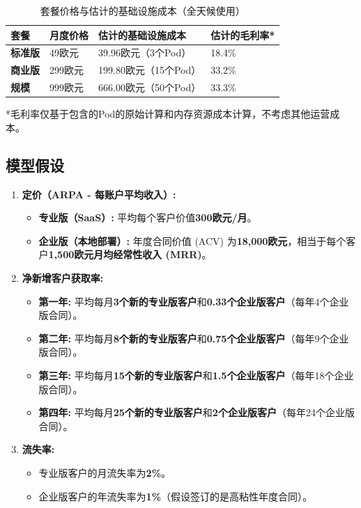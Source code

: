 \documentclass[11点, A4纸, 单面]{article}
\begin{document}
\begin{table}[H]
\centering
\caption{套餐价格与估计的基础设施成本（全天候使用）}
\label{tab:cost_analysis}
\begin{tabularx}{\textwidth}{L X X X} 
\toprule
\textbf{套餐} & \textbf{月度价格} & \textbf{估计的基础设施成本} & \textbf{估计的毛利率*} \\
\midrule
\textbf{标准版} & 49欧元 & 39.96欧元（3个Pod） & 18.4\% \\
\addlinespace
\textbf{商业版} & 299欧元 & 199.80欧元（15个Pod） & 33.2\% \\
\addlinespace
\textbf{规模} & 999欧元 & 666.00欧元（50个Pod） & 33.3\% \\
\bottomrule
\end{tabularx}
\raggedright
\footnotesize{*毛利率仅基于包含的Pod的原始计算和内存资源成本计算，不考虑其他运营成本。}
\end{table}



\subsection{模型假设}
\begin{enumerate}
    \item \textbf{定价（ARPA - 每账户平均收入）:}
    \begin{itemize}
        \item \textbf{专业版（SaaS）:} 平均每个客户价值\textbf{300欧元/月}。
        \item \textbf{企业版（本地部署）:} 年度合同价值 (ACV) 为\textbf{18,000欧元}，相当于每个客户\textbf{1,500欧元月均经常性收入 (MRR)}。
    \end{itemize}

    \item \textbf{净新增客户获取率:}
    \begin{itemize}
        \item \textbf{第一年:} 平均每月\textbf{3个新的专业版客户}和\textbf{0.33个企业版客户}（每年4个企业版合同）。
        \item \textbf{第二年:} 平均每月\textbf{8个新的专业版客户}和\textbf{0.75个企业版客户}（每年9个企业版合同）。
        \item \textbf{第三年:} 平均每月\textbf{15个新的专业版客户}和\textbf{1.5个企业版客户}（每年18个企业版合同）。
        \item \textbf{第四年:} 平均每月\textbf{25个新的专业版客户}和\textbf{2个企业版客户}（每年24个企业版合同）。
    \end{itemize}

    \item \textbf{流失率:}
    \begin{itemize}
        \item 专业版客户的月流失率为\textbf{2\%}。
        \item 企业版客户的年流失率为\textbf{1\%}（假设签订的是高粘性年度合同）。
    \end{itemize}
\end{enumerate}
\end{document}
